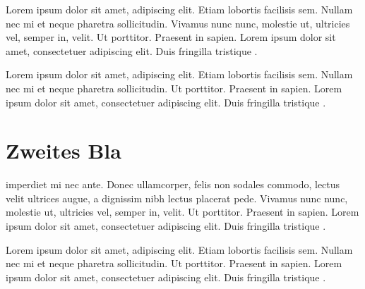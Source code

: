 \documentclass{article}
\begin{document}
\begin{pairs}
  \begin{Leftside}
    \beginnumbering
    \pstart
    Lorem ipsum dolor sit amet,
     adipiscing elit. Etiam
    lobortis facilisis sem. Nullam nec mi et neque pharetra
    sollicitudin. Vivamus nunc nunc, molestie ut, ultricies vel,
    semper in, velit.
    \pend
    \pstart
    Ut porttitor. Praesent in sapien. Lorem ipsum dolor sit amet,
    consectetuer adipiscing elit. Duis fringilla tristique
    .
    \pend
  \end{Leftside}
  \begin{Rightside}
    \beginnumbering
    \pstart
    Lorem ipsum dolor sit amet,
     adipiscing elit. Etiam
    lobortis facilisis sem. Nullam nec mi et neque pharetra
    sollicitudin.
    \pend
    \pstart
    Ut porttitor. Praesent in sapien. Lorem ipsum dolor sit amet,
    consectetuer adipiscing elit. Duis fringilla tristique
    .
    \pend
    \endnumbering
  \end{Rightside}
\Columns
\end{pairs}

\section{Zweites Bla}

\begin{pairs}
  \begin{Leftside}
    \pstart
     imperdiet mi nec
    ante. Donec ullamcorper, felis non sodales commodo, lectus velit
    ultrices augue, a dignissim nibh lectus placerat pede. Vivamus
    nunc nunc, molestie ut, ultricies vel, semper in, velit.
    \pend
    \pstart
    Ut porttitor. Praesent in sapien. Lorem ipsum dolor sit amet,
    consectetuer adipiscing elit. Duis fringilla tristique
    .
    \pend
    \endnumbering
  \end{Leftside}
  \begin{Rightside}
    \beginnumbering
    \pstart
    Lorem ipsum dolor sit amet,
     adipiscing elit. Etiam
    lobortis facilisis sem. Nullam nec mi et neque pharetra
    sollicitudin.
    \pend
    \pstart
    Ut porttitor. Praesent in sapien. Lorem ipsum dolor sit amet,
    consectetuer adipiscing elit. Duis fringilla tristique
    .
    \pend
    \endnumbering
  \end{Rightside}
\Columns
\end{pairs}
\end{document}
